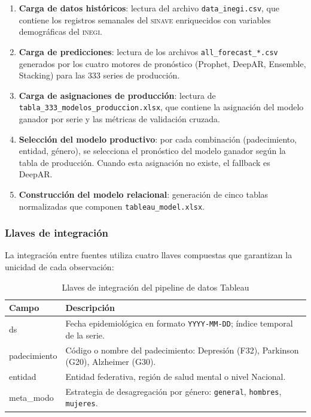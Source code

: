 \documentclass[12pt, letterpaper]{article}
\begin{document}
\begin{enumerate}[noitemsep]
    \item \textbf{Carga de datos históricos}: lectura del archivo \texttt{data\_inegi.csv}, que contiene los registros semanales del \textsc{sinave} enriquecidos con variables demográficas del \textsc{inegi}.
    \item \textbf{Carga de predicciones}: lectura de los archivos \texttt{all\_forecast\_*.csv} generados por los cuatro motores de pronóstico (Prophet, DeepAR, Ensemble, Stacking) para las 333 series de producción.
    \item \textbf{Carga de asignaciones de producción}: lectura de \texttt{tabla\_333\_modelos\_\allowbreak produccion.xlsx}, que contiene la asignación del modelo ganador por serie y las métricas de validación cruzada.
    \item \textbf{Selección del modelo productivo}: por cada combinación (padecimiento, entidad, género), se selecciona el pronóstico del modelo ganador según la tabla de producción. Cuando esta asignación no existe, el fallback es DeepAR.
    \item \textbf{Construcción del modelo relacional}: generación de cinco tablas normalizadas que componen \texttt{tableau\_model.xlsx}.
\end{enumerate}

\subsubsection{Llaves de integración}

La integración entre fuentes utiliza cuatro llaves compuestas que garantizan la unicidad de cada observación:

\begin{table}[H]
\centering
\caption{Llaves de integración del pipeline de datos Tableau}
\label{tab:llaves_tableau}
\small
\begin{tabularx}{\textwidth}{>{\ttfamily}l X}
\toprule
\textbf{Campo} & \textbf{Descripción} \\
\midrule
ds           & Fecha epidemiológica en formato \texttt{YYYY-MM-DD}; índice temporal de la serie. \\
padecimiento & Código o nombre del padecimiento: Depresión (F32), Parkinson (G20), Alzheimer (G30). \\
entidad      & Entidad federativa, región de salud mental o nivel Nacional. \\
meta\_modo   & Estrategia de desagregación por género: \texttt{general}, \texttt{hombres}, \texttt{mujeres}. \\
\bottomrule
\end{tabularx}
\end{table}
\end{document}

